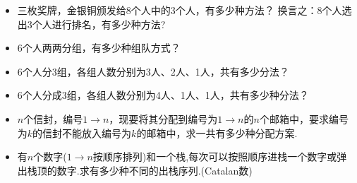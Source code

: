 \documentclass[UTF8]{article}
\begin{document}
\begin{itemize}
	\item 三枚奖牌，金银铜颁发给8个人中的3个人，有多少种方法？ 换言之：8个人选出3个人进行排名，有多少种方法?

	\item 6个人两两分组，有多少种组队方式？

	\item 6个人分3组，各组人数分别为3人、2人、1人，共有多少分法？

	\item 6个人分成3组，各组人数分别为4人、1人、1人，共有多少种分法？

	\item $n$个信封，编号$1\to n$，现要将其分配到编号为$1\to n$的$n$个邮箱中，要求编号为$k$的信封不能放入编号为$k$的邮箱中，求一共有多少种分配方案.

	\item 有$n$个数字($1\to n$按顺序排列)和一个栈,每次可以按照顺序进栈一个数字或弹出栈顶的数字.求有多少种不同的出栈序列.(Catalan数)
\end{itemize}
\end{document}
